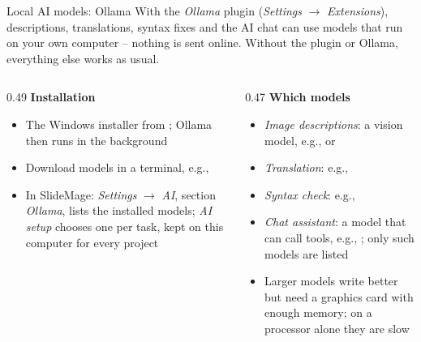 
\begin{standardframe}{Local AI models: Ollama}
	\small
	With the \emph{Ollama} plugin (\emph{Settings} $\rightarrow$ \emph{Extensions}), descriptions,
	translations, syntax fixes and the AI chat can use models
	that run on your own computer -- nothing is sent
	online. Without the plugin or Ollama, everything else works as usual.
	\par
	\begin{columns}[T,onlytextwidth]
		\begin{column}{0.49\linewidth}
			\textbf{Installation}
			\begin{itemize}
				\item The Windows installer from ; Ollama then runs in the background
				\item Download models in a terminal, e.g., 
				\item In SlideMage: \emph{Settings} $\rightarrow$ \emph{AI}, section \emph{Ollama}, lists the installed models; \emph{AI setup} chooses one per task, kept on this computer for every project
			\end{itemize}
		\end{column}
		\begin{column}{0.47\linewidth}
			\textbf{Which models}
			\begin{itemize}
				\item \emph{Image descriptions}: a vision model, e.g.,  or 
				\item \emph{Translation}: e.g., 
				\item \emph{Syntax check}: e.g., 
				\item \emph{Chat assistant}: a model that can call tools, e.g., ; only such models are listed
				\item Larger models write better but need a graphics card with enough memory; on a processor alone they are slow
			\end{itemize}
		\end{column}
	\end{columns}
\end{standardframe}
